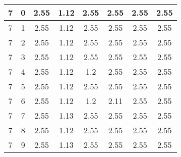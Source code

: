 \begin{longtable}{|c|c||c||c|c|c||c|c|}
	7 & 0 & 2.55 & 1.12 & 2.55 & 2.55 & 2.55 & 2.55 \\ \hline
	7 & 1 & 2.55 & 1.12 & 2.55 & 2.55 & 2.55 & 2.55 \\ \hline
	7 & 2 & 2.55 & 1.12 & 2.55 & 2.55 & 2.55 & 2.55 \\ \hline
	7 & 3 & 2.55 & 1.12 & 2.55 & 2.55 & 2.55 & 2.55 \\ \hline
	7 & 4 & 2.55 & 1.12 & 1.2 & 2.55 & 2.55 & 2.55 \\ \hline
	7 & 5 & 2.55 & 1.12 & 2.55 & 2.55 & 2.55 & 2.55 \\ \hline
	7 & 6 & 2.55 & 1.12 & 1.2 & 2.11 & 2.55 & 2.55 \\ \hline
	7 & 7 & 2.55 & 1.13 & 2.55 & 2.55 & 2.55 & 2.55 \\ \hline
	7 & 8 & 2.55 & 1.12 & 2.55 & 2.55 & 2.55 & 2.55 \\ \hline
	7 & 9 & 2.55 & 1.13 & 2.55 & 2.55 & 2.55 & 2.55 \\ \hline
\end{longtable}
\clearpage{}
